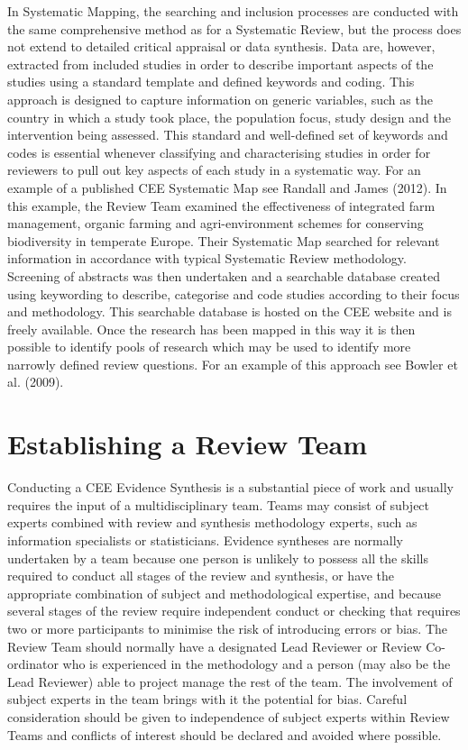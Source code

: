 \documentclass[
  letterpaper,
  DIV=11,
  numbers=noendperiod]{scrreprt}
\begin{document}
In Systematic Mapping, the searching and inclusion processes are
conducted with the same comprehensive method as for a Systematic Review,
but the process does not extend to detailed critical appraisal or data
synthesis. Data are, however, extracted from included studies in order
to describe important aspects of the studies using a standard template
and defined keywords and coding. This approach is designed to capture
information on generic variables, such as the country in which a study
took place, the population focus, study design and the intervention
being assessed. This standard and well-defined set of keywords and codes
is essential whenever classifying and characterising studies in order
for reviewers to pull out key aspects of each study in a systematic way.
For an example of a published CEE Systematic Map see Randall and James
(2012). In this example, the Review Team examined the effectiveness of
integrated farm management, organic farming and agri-environment schemes
for conserving biodiversity in temperate Europe. Their Systematic Map
searched for relevant information in accordance with typical Systematic
Review methodology. Screening of abstracts was then undertaken and a
searchable database created using keywording to describe, categorise and
code studies according to their focus and methodology. This searchable
database is hosted on the CEE website and is freely available. Once the
research has been mapped in this way it is then possible to identify
pools of research which may be used to identify more narrowly defined
review questions. For an example of this approach see Bowler et al.
(2009).

\section{\texorpdfstring{\textbf{Establishing a Review
Team}}{Establishing a Review Team}}\label{establishing-a-review-team}

Conducting a CEE Evidence Synthesis is a substantial piece of work and
usually requires the input of a multidisciplinary team. Teams may
consist of subject experts combined with review and synthesis
methodology experts, such as information specialists or statisticians.
Evidence syntheses are normally undertaken by a team because one person
is unlikely to possess all the skills required to conduct all stages of
the review and synthesis, or have the appropriate combination of subject
and methodological expertise, and because several stages of the review
require independent conduct or checking that requires two or more
participants to minimise the risk of introducing errors or bias. The
Review Team should normally have a designated Lead Reviewer or Review
Co-ordinator who is experienced in the methodology and a person (may
also be the Lead Reviewer) able to project manage the rest of the team.
The involvement of subject experts in the team brings with it the
potential for bias. Careful consideration should be given to
independence of subject experts within Review Teams and conflicts of
interest should be declared and avoided where possible.
\end{document}
